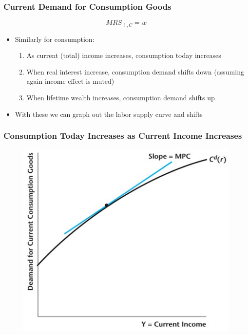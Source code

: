 \documentclass{beamer}
\begin{document}
\begin{frame}
\frametitle[alignment=center]{Current Demand for Consumption Goods}
$$MRS_{\ell,C}=w$$
\begin{itemize}
\item Similarly for consumption:
\begin{enumerate}
\item As current (total) income increases, consumption today increases
\item When real interest increase, consumption demand shifts down (assuming again income effect is muted)
\item When lifetime wealth increases, consumption demand shifts up
\end{enumerate}
\item With these we can graph out the labor supply curve and shifts
\end{itemize}
\end{frame}

\begin{frame}
\frametitle[alignment=center]{Consumption Today Increases as Current Income Increases}
\begin{figure}
\centering
\includegraphics[scale=0.6]{Figures/W_Fig_11pt4.png}
\end{figure}
\end{frame}
\end{document}
